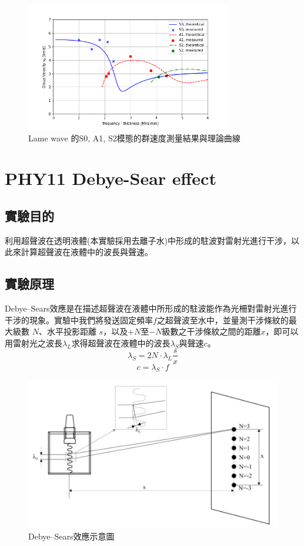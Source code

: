 \documentclass[12pt]{report}
\begin{document}
\begin{figure}[htbp]
    \centering
    \includegraphics[width=0.8\textwidth]{PHY21.png}
    \caption{Lame wave 的S0, A1, S2模態的群速度測量結果與理論曲線}
    \label{fig:phy21}
\end{figure}






\chapter{PHY11 Debye-Sear effect}\label{PHY11}

\section{實驗目的}
利用超聲波在透明液體(本實驗採用去離子水)中形成的駐波對雷射光進行干涉，以此來計算超聲波在液體中的波長與聲速。
\section{實驗原理}
Debye–Sears效應是在描述超聲波在液體中所形成的駐波能作為光柵對雷射光進行干涉的現象。實驗中我們將發送固定頻率$f$之超聲波至水中，並量測干涉條紋的最大級數 $N$、水平投影距離 $s$，以及$+N$至$-N$級數之干涉條紋之間的距離$x$，即可以用雷射光之波長$\lambda_L$求得超聲波在液體中的波長$\lambda_S$與聲速$c$。
\begin{equation}
    \lambda_S=2N\cdot\lambda_L\frac{s}{x}
\end{equation}
\begin{equation}
    c=\lambda_S\cdot f
\end{equation}
\begin{figure}
    \centering
    \includegraphics[width=0.5\linewidth]{PHY11-1.png}
    \caption{Debye–Sears效應示意圖}
    \label{fig:PHY11_1}
\end{figure}
\end{document}
